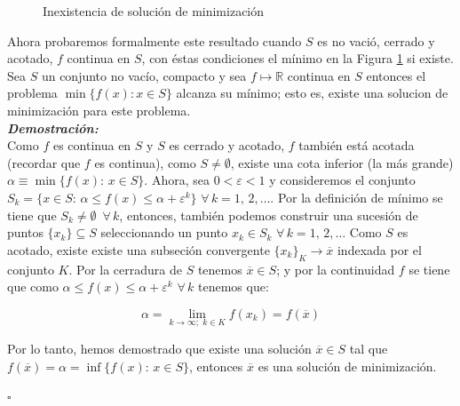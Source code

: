 \begin{figure}
   \caption{Inexistencia de soluci\'on de minimizaci\'on \cite{no-lineal}}
   \label{no_sol}
\end{figure}


Ahora probaremos formalmente este resultado cuando $S$ es no vaci\'o, cerrado y acotado, $f$ continua en $S$, con \'estas condiciones
el m\'inimo en la Figura \ref{no_sol} si existe.\\

{\teorema Sea $S$ un conjunto no vac\'io, compacto y sea $f \longmapsto \mathbb{R}$ continua en $S$ entonces el problema
$\min \{f(x): x \in S\}$ alcanza su m\'inimo; esto es, existe una solucion de minimizaci\'on para este problema. \label{sol-min}}\\

\textbf{\itshape Demostraci\'on:}\\

Como $f$ es continua en $S$ y $S$ es cerrado y acotado, $f$ tambi\'en est\'a acotada (recordar que $f$ es continua), como $S \neq \emptyset$,
existe una cota inferior (la m\'as grande) $\alpha \equiv \min \{f(x):\, x \in S\}$. Ahora, sea $0 < \varepsilon < 1$ y consideremos el
conjunto $S_{k} = \{x \in S:\, \alpha \leqslant f(x) \leqslant \alpha + \varepsilon^{k}\}\,\, \forall\, k=1,\, 2, \ldots .$ Por la 
definici\'on de m\'inimo se tiene que $S_{k} \neq \emptyset \,\,\, \forall \, k$, entonces, tambi\'en podemos construir una sucesi\'on de puntos
$\{x_k\} \subseteq S$ seleccionando un punto $x_k \in S_k\,\, \forall \, k =1,\,2, \ldots $ Como $S$ es acotado, existe existe una
subseci\'on convergente $\{x_k \}_{K}\rightarrow \overline{x}$ indexada por el conjunto $K$. Por la cerradura de $S$ tenemos
$\overline{x} \in S$; y por la continuidad $f$ se tiene que como  $\alpha \leqslant f(x) \leqslant \alpha + \varepsilon^{k} \,\, \forall\, k$
tenemos que:

$$\alpha = \displaystyle{\lim_{k \rightarrow \infty; \,\, k \in K}} f(x_k) = f(\overline{x})$$

Por lo tanto, hemos demostrado que existe una soluci\'on $\overline{x} \in S$ tal que $f(\overline{x}) = \alpha = \inf \{f(x):\, x \in S\}$, 
entonces $\overline{x}$ es una soluci\'on de minimizaci\'on.
\begin{flushright}
   $\square$
\end{flushright}

